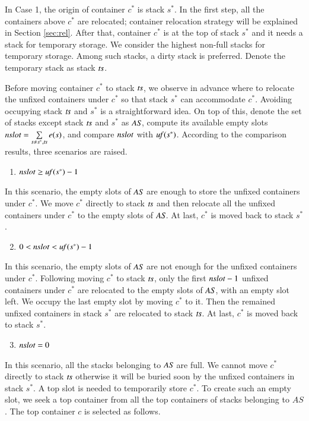 \documentclass[review,3p,times,authoryear,12pt]{elsarticle}
\begin{document}
In Case 1, the origin of container $c^*$ is stack $s^*$. In the first step, all the containers above $c^*$ are relocated; container relocation strategy will be explained in Section \ref{sec:rel}. After that, container $c^*$ is at the top of stack $s^*$ and it needs a stack for temporary storage. We consider the highest non-full stacks for temporary storage. Among such stacks, a dirty stack is preferred. Denote the temporary stack as stack $\id{ts}$.

Before moving container $c^*$ to stack $\id{ts}$, we observe in advance where to relocate the unfixed containers under $c^*$ so that stack $s^*$ can accommodate $c^*$. Avoiding occupying stack $\id{ts}$ and $s^*$ is a straightforward idea. On top of this, denote the set of stacks except stack $\id{ts}$ and $s^*$ as $\id{AS}$, compute its available empty slots $\id{nslot} = \sum\limits_{s\neq s^*, \id{ts}}e(s)$, and compare $\id{nslot}$ with $\id{uf}(s^*)$. According to the comparison results, three scenarios are raised.

\begin{enumerate}
\setcounter{enumi}{0}
\item $\id{nslot}\ge \id{uf}(s^*)-1$
\end{enumerate}
In this scenario, the empty slots of $\id{AS}$ are enough to store the unfixed containers under $c^*$. We move $c^*$ directly to stack $\id{ts}$ and then relocate all the unfixed containers under $c^*$ to the empty slots of $\id{AS}$. At last, $c^*$ is moved back to stack $s^*$.

\begin{enumerate}
\setcounter{enumi}{1}
\item $0<\id{nslot}< \id{uf}(s^*)-1$
\end{enumerate}
In this scenario, the empty slots of $\id{AS}$ are not enough for the unfixed containers under $c^*$. Following moving $c^*$ to stack $\id{ts}$, only the first $\id{nslot}-1$ unfixed containers under $c^*$ are relocated to the empty slots of $\id{AS}$, with an empty slot left. We occupy the last empty slot by moving $c^*$ to it. Then the remained unfixed containers in stack $s^*$ are relocated to stack $\id{ts}$. At last, $c^*$ is moved back to stack $s^*$.
\begin{enumerate}
\setcounter{enumi}{2}
\item $\id{nslot}=0$
\end{enumerate}
In this scenario, all the stacks belonging to $\id{AS}$ are full. We cannot move $c^*$ directly to stack $\id{ts}$ otherwise it will be buried soon by the unfixed containers in stack $s^*$. A top slot is needed to temporarily store $c^*$. To create such an empty slot, we seek a top container from all the top containers of stacks belonging to $AS$. The top container $c$ is selected as follows.
\end{document}
